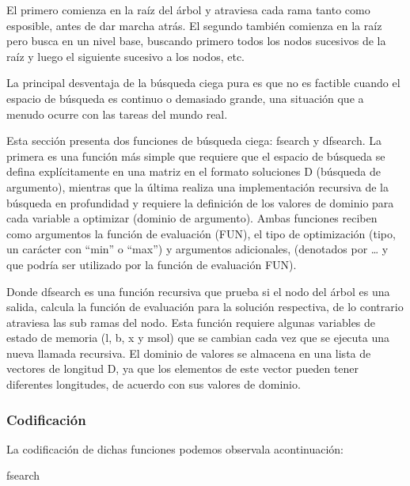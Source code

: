 \documentclass[11pt,]{article}
\newenvironment{Shaded}{\begin{snugshade}}{\end{snugshade}}
\newcommand{\NormalTok}[1]{#1}
\begin{document}
El primero comienza en la raíz del árbol y atraviesa cada rama tanto
como esposible, antes de dar marcha atrás. El segundo también comienza
en la raíz pero busca en un nivel base, buscando primero todos los nodos
sucesivos de la raíz y luego el siguiente sucesivo a los nodos, etc.

La principal desventaja de la búsqueda ciega pura es que no es factible
cuando el espacio de búsqueda es continuo o demasiado grande, una
situación que a menudo ocurre con las tareas del mundo real.

Esta sección presenta dos funciones de búsqueda ciega: fsearch y
dfsearch. La primera es una función más simple que requiere que el
espacio de búsqueda se defina explícitamente en una matriz en el formato
soluciones D (búsqueda de argumento), mientras que la última realiza una
implementación recursiva de la búsqueda en profundidad y requiere la
definición de los valores de dominio para cada variable a optimizar
(dominio de argumento). Ambas funciones reciben como argumentos la
función de evaluación (FUN), el tipo de optimización (tipo, un carácter
con ``min'' o ``max'') y argumentos adicionales, (denotados por \ldots{}
y que podría ser utilizado por la función de evaluación FUN).

Donde dfsearch es una función recursiva que prueba si el nodo del árbol
es una salida, calcula la función de evaluación para la solución
respectiva, de lo contrario atraviesa las sub ramas del nodo. Esta
función requiere algunas variables de estado de memoria (l, b, x y msol)
que se cambian cada vez que se ejecuta una nueva llamada recursiva. El
dominio de valores se almacena en una lista de vectores de longitud D,
ya que los elementos de este vector pueden tener diferentes longitudes,
de acuerdo con sus valores de dominio.

\newpage

\hypertarget{codificaciuxf3n}{%
\subsubsection{Codificación}\label{codificaciuxf3n}}

La codificación de dichas funciones podemos observala acontinuación:

\begin{Shaded}
\begin{Highlighting}[]
\NormalTok{fsearch}
\end{Highlighting}
\end{Shaded}
\end{document}

